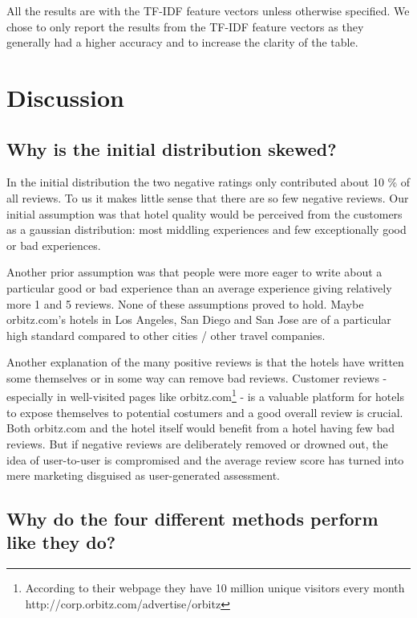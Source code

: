 \documentclass{article}
\begin{document}
All the results are with the TF-IDF feature vectors unless otherwise specified. We chose to only report the results from the TF-IDF feature vectors as they generally had a higher accuracy and to increase the clarity of the table.

\section{Discussion}

\subsection{Why is the initial distribution skewed?}
In the initial distribution the two negative ratings only contributed about 10 \% of all reviews. To us it makes little sense that there are so few negative reviews. Our initial assumption was that hotel quality would be perceived from the customers as a gaussian distribution: most middling experiences and few exceptionally good or bad experiences. 

Another prior assumption was that people were more eager to write about a particular good or bad experience than an average experience giving relatively more 1 and 5 reviews. None of these assumptions proved to hold. Maybe orbitz.com’s hotels in Los Angeles, San Diego and San Jose are of a particular high standard compared to other cities / other travel companies.

Another explanation of the many positive reviews is that the hotels have written some themselves or in some way can remove bad reviews. Customer reviews - especially in well-visited pages like orbitz.com\footnote{According to their webpage they have 10 million unique visitors every month http://corp.orbitz.com/advertise/orbitz} - is a valuable platform for hotels to expose themselves to potential costumers and a good overall review is crucial. Both orbitz.com and the hotel itself would benefit from a hotel having few bad reviews. But if negative reviews are deliberately removed or drowned out, the idea of user-to-user is compromised and the average review score has turned into mere marketing disguised as user-generated assessment. 

\subsection{Why do the four different methods perform like they do?}
\end{document}
